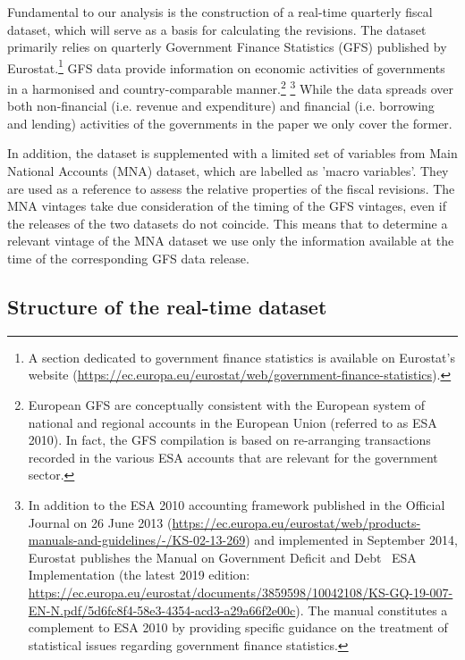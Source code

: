 Fundamental to our analysis is the construction of a real-time quarterly fiscal dataset, which will serve as a basis for calculating the revisions. The dataset primarily relies on quarterly Government Finance Statistics (GFS) published by Eurostat.\footnote{A section dedicated to government finance statistics is available on Eurostat's website (\url{https://ec.europa.eu/eurostat/web/government-finance-statistics}).} GFS data provide information on economic activities of governments in a harmonised and country-comparable manner.\footnote{European GFS are conceptually consistent with the European system of national and regional accounts in the European Union (referred to as ESA 2010). In fact, the GFS compilation is based on re-arranging transactions recorded in the various ESA accounts that are relevant for the government sector.} \footnote{In addition to the ESA 2010 accounting framework published in the Official Journal on 26 June 2013 (\url{https://ec.europa.eu/eurostat/web/products-manuals-and-guidelines/-/KS-02-13-269}) and implemented in September 2014, Eurostat publishes the Manual on Government Deficit and Debt \textemdash~ESA Implementation (the latest 2019 edition: \url{https://ec.europa.eu/eurostat/documents/3859598/10042108/KS-GQ-19-007-EN-N.pdf/5d6fc8f4-58e3-4354-acd3-a29a66f2e00c}). The manual constitutes a complement to ESA 2010 by providing specific guidance on the treatment of statistical issues regarding government finance statistics.} While the data spreads over both non-financial (i.e. revenue and expenditure) and financial (i.e. borrowing and lending) activities of the governments in the paper we only cover the former.

In addition, the dataset is supplemented with a limited set of variables from Main National Accounts (MNA) dataset, which are labelled as 'macro variables'. They are used as a reference to assess the relative properties of the fiscal revisions. The MNA vintages take due consideration of the timing of the GFS vintages, even if the releases of the two datasets do not coincide. This means that to determine a relevant vintage of the MNA dataset we use only the information available at the time of the corresponding GFS data release.

\subsection{Structure of the real-time dataset\label{subsec:Structure of the real-time dataset}}

